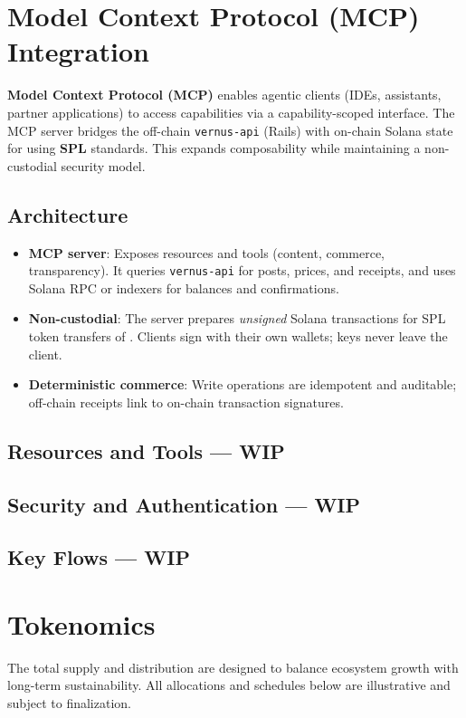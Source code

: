 \documentclass[10pt]{article}
\begin{document}
  \section{Model Context Protocol (MCP) Integration}
    \textbf{Model Context Protocol (MCP)} enables agentic clients (IDEs, assistants, partner applications) to access \textbf{\projectname{}} capabilities via a capability-scoped interface. The MCP server bridges the off-chain \texttt{vernus-api} (Rails) with on-chain Solana state for \textbf{\tokenticker{}} using \textbf{SPL} standards. This expands composability while maintaining a non-custodial security model.

    \subsection{Architecture}
    \begin{itemize}[leftmargin=*]
      \item \textbf{MCP server}: Exposes resources and tools (content, commerce, transparency). It queries \texttt{vernus-api} for posts, prices, and receipts, and uses Solana RPC or indexers for balances and confirmations.
      \item \textbf{Non-custodial}: The server prepares \emph{unsigned} Solana transactions for SPL token transfers of \tokenticker{}. Clients sign with their own wallets; keys never leave the client.
      \item \textbf{Deterministic commerce}: Write operations are idempotent and auditable; off-chain receipts link to on-chain transaction signatures.
    \end{itemize}

    \subsection{Resources and Tools --- WIP}

    \subsection{Security and Authentication --- WIP}

    \subsection{Key Flows --- WIP}

  \section{Tokenomics}
    The total supply and distribution are designed to balance ecosystem growth with long-term sustainability. All allocations and schedules below are illustrative and subject to finalization.
\end{document}
